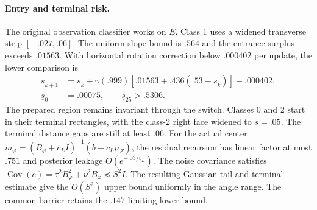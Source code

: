 \paragraph{Entry and terminal risk.}
The original observation classifier works on $E$. Class 1 uses
a widened transverse strip $[-.027,.06]$. The uniform slope
bound is $.564$ and the entrance surplus exceeds $.01563$.
With horizontal rotation correction below $.000402$ per
update, the lower comparison is
\begin{align*}
 \underline s_{k+1}&=\underline s_k+
    \gamma(.999)[.01563+.436(.53-\underline s_k)]-.000402,\\
 \underline s_0&=.00075,\qquad \underline s_{25}>.5306.
\end{align*}
The prepared region remains invariant through the switch.
Classes 0 and 2 start in their terminal rectangles, with the
class-2 right face widened to $s=.05$. The terminal
distance gaps are still at least $.06$.
For the actual center
$m_\varphi=(B_\varphi+c_LI)^{-1}(b+c_L\mu_Z)$, the
residual recursion has linear factor at most $.751$ and
posterior leakage $O(e^{-.03/v_L})$.
The noise covariance satisfies
$\operatorname{Cov}(e)=\tau^2B_\varphi^2+\nu^2B_\varphi\preceq S^2I$.
The resulting Gaussian tail and terminal estimate give the
$O(S^2)$ upper bound uniformly in the angle range. The common
barrier retains the $.147$ limiting lower bound.
